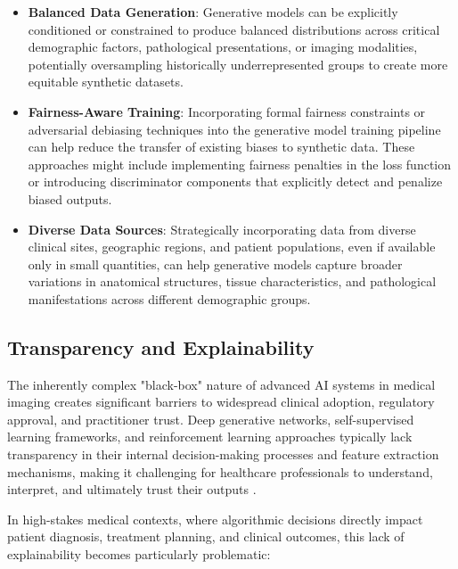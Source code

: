 \documentclass{article}
\begin{document}
\begin{itemize}
    \item \textbf{Balanced Data Generation}: Generative models can be explicitly conditioned or constrained to produce balanced distributions across critical demographic factors, pathological presentations, or imaging modalities, potentially oversampling historically underrepresented groups to create more equitable synthetic datasets.
    
    \item \textbf{Fairness-Aware Training}: Incorporating formal fairness constraints or adversarial debiasing techniques into the generative model training pipeline can help reduce the transfer of existing biases to synthetic data. These approaches might include implementing fairness penalties in the loss function or introducing discriminator components that explicitly detect and penalize biased outputs.
    
    \item \textbf{Diverse Data Sources}: Strategically incorporating data from diverse clinical sites, geographic regions, and patient populations, even if available only in small quantities, can help generative models capture broader variations in anatomical structures, tissue characteristics, and pathological manifestations across different demographic groups.
\end{itemize}


\subsection{Transparency and Explainability}
The inherently complex "black-box" nature of advanced AI systems in medical imaging creates significant barriers to widespread clinical adoption, regulatory approval, and practitioner trust. Deep generative networks, self-supervised learning frameworks, and reinforcement learning approaches typically lack transparency in their internal decision-making processes and feature extraction mechanisms, making it challenging for healthcare professionals to understand, interpret, and ultimately trust their outputs \cite{vermaRoleDeepLearning2023}.

In high-stakes medical contexts, where algorithmic decisions directly impact patient diagnosis, treatment planning, and clinical outcomes, this lack of explainability becomes particularly problematic:
\end{document}
